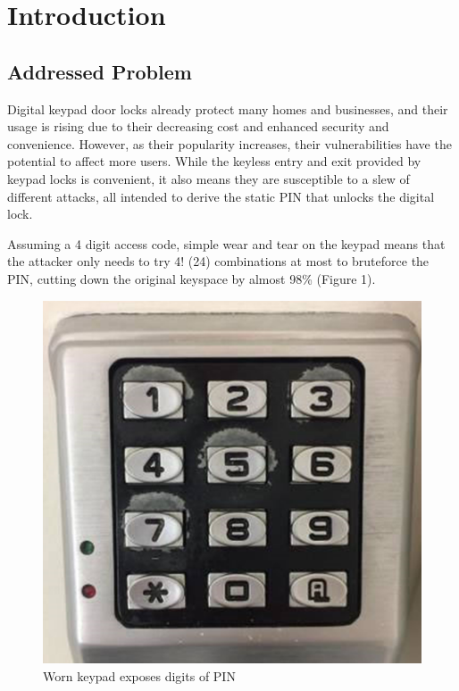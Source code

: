 \documentclass[conference]{IEEEtran}
\begin{document}
\section{Introduction}

\subsection{Addressed Problem}
Digital keypad door locks already protect many homes and businesses, and their usage is rising due to their decreasing cost and enhanced security and convenience. However, as their popularity increases, their vulnerabilities have the potential to affect more users. While the keyless entry and exit provided by keypad locks is convenient, it also means they are susceptible to a slew of different attacks, all intended to derive the static PIN that unlocks the digital lock.

Assuming a 4 digit access code, simple wear and tear on the keypad means that the attacker only needs to try 4! (24) combinations at most to bruteforce the PIN, cutting down the original keyspace by almost 98\% (Figure 1).

\begin{figure}[h!]
  \includegraphics[width=\linewidth]{worn_lock.png}
  \caption{Worn keypad exposes digits of PIN}
  \label{fig:wornlock}
\end{figure}
\end{document}
